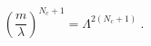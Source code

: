 \begin{equation}
\left(\frac{m}{\lambda}\right)^{N_c+1}= \Lambda^{2 
\left(N_c+1\right)} ~. 
\end{equation}


